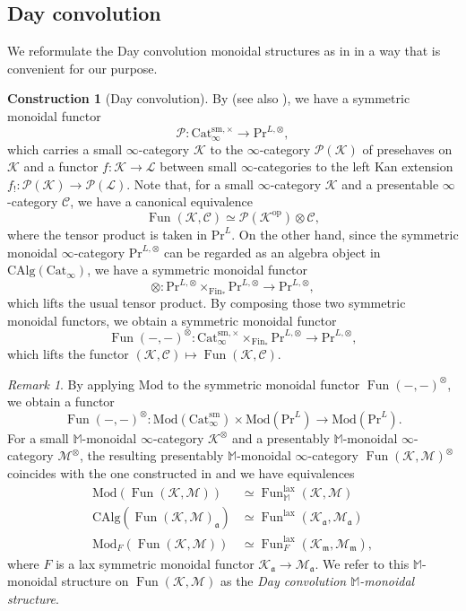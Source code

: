 \documentclass{amsart}
\theoremstyle{plain}
\theoremstyle{definition}
\newtheorem{construction}[theorem]{Construction}
\theoremstyle{remark}
\newtheorem{remark}[theorem]{Remark}
\numberwithin{equation}{theorem}
\newcommand{\mcal}[1]{\mathcal{#1}}
\newcommand{\mbb}[1]{\mathbb{#1}}
\newcommand{\mfk}[1]{\mathfrak{#1}}
\newcommand{\CAlg}{\mathrm{CAlg}}
\newcommand{\Cat}{\mathrm{Cat}}
\newcommand{\Fin}{\mathrm{Fin}}
\newcommand{\Mod}{\mathrm{Mod}}
\renewcommand{\Pr}{\mathrm{Pr}}
\newcommand{\lax}{\mathrm{lax}}
\newcommand{\op}{\mathrm{op}}
\newcommand{\sm}{\mathrm{sm}}
\newcommand{\Fun}{\operatorname{Fun}}
\begin{document}
\subsection{Day convolution}\label{Day}

We reformulate the Day convolution monoidal structures as in \cite[2.2.6]{HA} in a way that is convenient for our purpose.

\begin{construction}[Day convolution]\label{cons:Day}
By \cite[4.8.1.3]{HA} (see also \cite[4.8.1.8]{HA}), we have a symmetric monoidal functor
\[
	\mcal{P} \colon \Cat_\infty^{\sm,\times} \to \Pr^{L,\otimes},
\]
which carries a small $\infty$-category $\mcal{K}$ to the $\infty$-category $\mcal{P}(\mcal{K})$ of presehaves on $\mcal{K}$ and a functor $f\colon \mcal{K}\to\mcal{L}$ between small $\infty$-categories to the left Kan extension $f_!\colon\mcal{P}(\mcal{K})\to\mcal{P}(\mcal{L})$.
Note that, for a small $\infty$-category $\mcal{K}$ and a presentable $\infty$-category $\mcal{C}$, we have a canonical equivalence
\[
	\Fun(\mcal{K},\mcal{C}) \simeq \mcal{P}(\mcal{K}^\op)\otimes\mcal{C},
\]
where the tensor product is taken in $\Pr^L$.
On the other hand, since the symmetric monoidal $\infty$-category $\Pr^{L,\otimes}$ can be regarded as an algebra object in $\CAlg(\Cat_\infty)$, we have a symmetric monoidal functor
\[
	\otimes \colon \Pr^{L,\otimes}\times_{\Fin_*}\Pr^{L,\otimes} \to \Pr^{L,\otimes},
\]
which lifts the usual tensor product.
By composing those two symmetric monoidal functors, we obtain a symmetric monoidal functor
\[
	\Fun(-,-)^\otimes \colon \Cat_\infty^{\sm,\times}\times_{\Fin_*}\Pr^{L,\otimes} \to \Pr^{L,\otimes},
\]
which lifts the functor $(\mcal{K},\mcal{C})\mapsto\Fun(\mcal{K},\mcal{C})$.
\end{construction}

\begin{remark}
By applying $\Mod$ to the symmetric monoidal functor $\Fun(-,-)^\otimes$, we obtain a functor
\[
	\Fun(-,-)^\otimes \colon \Mod(\Cat_\infty^\sm)\times\Mod(\Pr^L) \to \Mod(\Pr^L).
\]
For a small $\mbb{M}$-monoidal $\infty$-category $\mcal{K}^\otimes$ and a presentably $\mbb{M}$-monoidal $\infty$-category $\mcal{M}^\otimes$, 
the resulting presentably $\mbb{M}$-monoidal $\infty$-category $\Fun(\mcal{K},\mcal{M})^\otimes$ coincides with the one constructed in \cite[2.2.6]{HA} and we have equivalences
\begin{align*}
	\Mod(\Fun(\mcal{K},\mcal{M})) &\simeq \Fun^\lax_\mbb{M}(\mcal{K},\mcal{M}) \\
	\CAlg(\Fun(\mcal{K},\mcal{M})_\mfk{a}) &\simeq \Fun^\lax(\mcal{K}_\mfk{a},\mcal{M}_\mfk{a}) \\
	\Mod_F(\Fun(\mcal{K},\mcal{M})) &\simeq \Fun^\lax_F(\mcal{K}_\mfk{m},\mcal{M}_{\mfk{m}}),
\end{align*}
where $F$ is a lax symmetric monoidal functor $\mcal{K}_\mfk{a}\to\mcal{M}_\mfk{a}$.
We refer to this $\mbb{M}$-monoidal structure on $\Fun(\mcal{K},\mcal{M})$ as the \textit{Day convolution $\mbb{M}$-monoidal structure}.
\end{remark}
\end{document}
